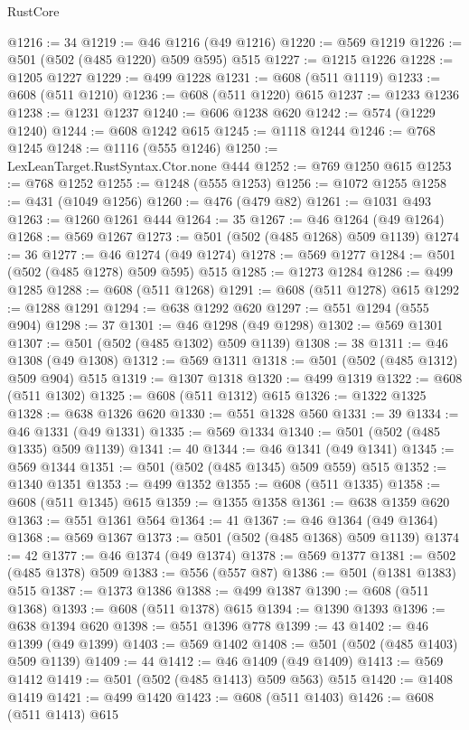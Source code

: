 \begin{lexlean}{RustCore}
\begin{coremodule}
@1216 := 34
@1219 := @46 @1216 (@49 @1216)
@1220 := @569 @1219
@1226 := @501 (@502 (@485 @1220) @509 @595) @515
@1227 := @1215 @1226
@1228 := @1205 @1227
@1229 := @499 @1228
@1231 := @608 (@511 @1119)
@1233 := @608 (@511 @1210)
@1236 := @608 (@511 @1220) @615
@1237 := @1233 @1236
@1238 := @1231 @1237
@1240 := @606 @1238 @620
@1242 := @574 (@1229 @1240)
@1244 := @608 @1242 @615
@1245 := @1118 @1244
@1246 := @768 @1245
@1248 := @1116 (@555 @1246)
@1250 := LexLeanTarget.RustSyntax.Ctor.none @444
@1252 := @769 @1250 @615
@1253 := @768 @1252
@1255 := @1248 (@555 @1253)
@1256 := @1072 @1255
@1258 := @431 (@1049 @1256)
@1260 := @476 (@479 @82)
@1261 := @1031 @493
@1263 := @1260 @1261 @444
@1264 := 35
@1267 := @46 @1264 (@49 @1264)
@1268 := @569 @1267
@1273 := @501 (@502 (@485 @1268) @509 @1139)
@1274 := 36
@1277 := @46 @1274 (@49 @1274)
@1278 := @569 @1277
@1284 := @501 (@502 (@485 @1278) @509 @595) @515
@1285 := @1273 @1284
@1286 := @499 @1285
@1288 := @608 (@511 @1268)
@1291 := @608 (@511 @1278) @615
@1292 := @1288 @1291
@1294 := @638 @1292 @620
@1297 := @551 @1294 (@555 @904)
@1298 := 37
@1301 := @46 @1298 (@49 @1298)
@1302 := @569 @1301
@1307 := @501 (@502 (@485 @1302) @509 @1139)
@1308 := 38
@1311 := @46 @1308 (@49 @1308)
@1312 := @569 @1311
@1318 := @501 (@502 (@485 @1312) @509 @904) @515
@1319 := @1307 @1318
@1320 := @499 @1319
@1322 := @608 (@511 @1302)
@1325 := @608 (@511 @1312) @615
@1326 := @1322 @1325
@1328 := @638 @1326 @620
@1330 := @551 @1328 @560
@1331 := 39
@1334 := @46 @1331 (@49 @1331)
@1335 := @569 @1334
@1340 := @501 (@502 (@485 @1335) @509 @1139)
@1341 := 40
@1344 := @46 @1341 (@49 @1341)
@1345 := @569 @1344
@1351 := @501 (@502 (@485 @1345) @509 @559) @515
@1352 := @1340 @1351
@1353 := @499 @1352
@1355 := @608 (@511 @1335)
@1358 := @608 (@511 @1345) @615
@1359 := @1355 @1358
@1361 := @638 @1359 @620
@1363 := @551 @1361 @564
@1364 := 41
@1367 := @46 @1364 (@49 @1364)
@1368 := @569 @1367
@1373 := @501 (@502 (@485 @1368) @509 @1139)
@1374 := 42
@1377 := @46 @1374 (@49 @1374)
@1378 := @569 @1377
@1381 := @502 (@485 @1378) @509
@1383 := @556 (@557 @87)
@1386 := @501 (@1381 @1383) @515
@1387 := @1373 @1386
@1388 := @499 @1387
@1390 := @608 (@511 @1368)
@1393 := @608 (@511 @1378) @615
@1394 := @1390 @1393
@1396 := @638 @1394 @620
@1398 := @551 @1396 @778
@1399 := 43
@1402 := @46 @1399 (@49 @1399)
@1403 := @569 @1402
@1408 := @501 (@502 (@485 @1403) @509 @1139)
@1409 := 44
@1412 := @46 @1409 (@49 @1409)
@1413 := @569 @1412
@1419 := @501 (@502 (@485 @1413) @509 @563) @515
@1420 := @1408 @1419
@1421 := @499 @1420
@1423 := @608 (@511 @1403)
@1426 := @608 (@511 @1413) @615

\end{coremodule}
\end{lexlean}
